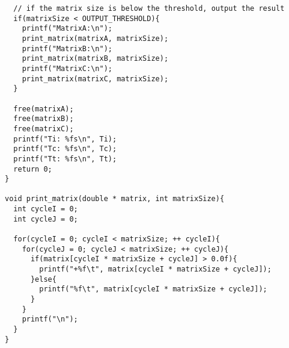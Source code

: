\begin{verbatim}
  // if the matrix size is below the threshold, output the result
  if(matrixSize < OUTPUT_THRESHOLD){
    printf("MatrixA:\n");
    print_matrix(matrixA, matrixSize);
    printf("MatrixB:\n");
    print_matrix(matrixB, matrixSize);
    printf("MatrixC:\n");
    print_matrix(matrixC, matrixSize);
  }

  free(matrixA);
  free(matrixB);
  free(matrixC);
  printf("Ti: %fs\n", Ti);
  printf("Tc: %fs\n", Tc);
  printf("Tt: %fs\n", Tt);
  return 0;
}

void print_matrix(double * matrix, int matrixSize){
  int cycleI = 0;
  int cycleJ = 0;

  for(cycleI = 0; cycleI < matrixSize; ++ cycleI){
    for(cycleJ = 0; cycleJ < matrixSize; ++ cycleJ){
      if(matrix[cycleI * matrixSize + cycleJ] > 0.0f){
        printf("+%f\t", matrix[cycleI * matrixSize + cycleJ]);
      }else{
        printf("%f\t", matrix[cycleI * matrixSize + cycleJ]);
      }
    }
    printf("\n");
  }
}
\end{verbatim}
\normalsize